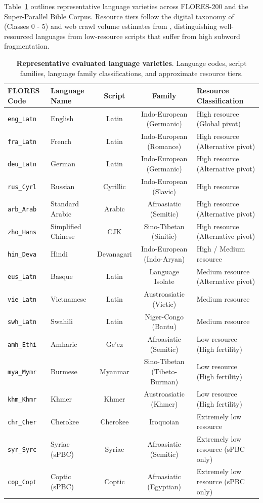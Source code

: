 Table~\ref{tab:appendix-language-sample} outlines representative language varieties across FLORES-200 and the Super-Parallel Bible Corpus. Resource tiers follow the digital taxonomy of \citet{joshi2020state} (Classes 0 - 5) and web crawl volume estimates from \citet{nllbteam2022}, distinguishing well-resourced languages from low-resource scripts that suffer from high subword fragmentation.

\begin{table}[H]
\centering
\footnotesize
\setlength{\tabcolsep}{4.5pt}
\renewcommand{\arraystretch}{0.90}
\begin{tabularx}{\textwidth}{@{}llccX@{}}
\toprule
\textbf{FLORES Code} & \textbf{Language Name} & \textbf{Script} & \textbf{Family} & \textbf{Resource Classification} \\
\midrule
\texttt{eng\_Latn} & English & Latin & Indo-European (Germanic) & High resource (Global pivot) \\
\texttt{fra\_Latn} & French & Latin & Indo-European (Romance) & High resource (Alternative pivot) \\
\texttt{deu\_Latn} & German & Latin & Indo-European (Germanic) & High resource (Alternative pivot) \\
\texttt{rus\_Cyrl} & Russian & Cyrillic & Indo-European (Slavic) & High resource \\
\texttt{arb\_Arab} & Standard Arabic & Arabic & Afroasiatic (Semitic) & High resource (Alternative pivot) \\
\texttt{zho\_Hans} & Simplified Chinese & CJK & Sino-Tibetan (Sinitic) & High resource (Alternative pivot) \\
\texttt{hin\_Deva} & Hindi & Devanagari & Indo-European (Indo-Aryan) & High / Medium resource \\
\texttt{eus\_Latn} & Basque & Latin & Language Isolate & Medium resource (Alternative pivot) \\
\texttt{vie\_Latn} & Vietnamese & Latin & Austroasiatic (Vietic) & Medium resource \\
\texttt{swh\_Latn} & Swahili & Latin & Niger-Congo (Bantu) & Medium resource \\
\texttt{amh\_Ethi} & Amharic & Ge'ez & Afroasiatic (Semitic) & Low resource (High fertility) \\
\texttt{mya\_Mymr} & Burmese & Myanmar & Sino-Tibetan (Tibeto-Burman) & Low resource (High fertility) \\
\texttt{khm\_Khmr} & Khmer & Khmer & Austroasiatic (Khmer) & Low resource (High fertility) \\
\texttt{chr\_Cher} & Cherokee & Cherokee & Iroquoian & Extremely low resource \\
\texttt{syr\_Syrc} & Syriac (sPBC) & Syriac & Afroasiatic (Semitic) & Extremely low resource (sPBC only) \\
\texttt{cop\_Copt} & Coptic (sPBC) & Coptic & Afroasiatic (Egyptian) & Extremely low resource (sPBC only) \\
\bottomrule
\end{tabularx}
\caption{\textbf{Representative evaluated language varieties}. Language codes, script families, language family classifications, and approximate resource tiers.}
\label{tab:appendix-language-sample}
\end{table}

